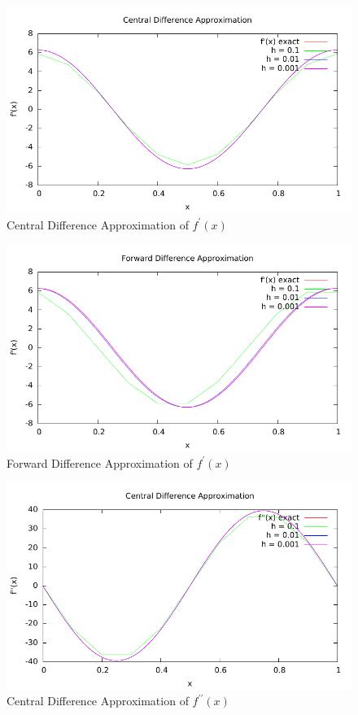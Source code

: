 \documentclass[addpoints]{exam}
\begin{document}
\begin{questions}
\begin{solution}
\begin{figure}[H]
\centering
\includegraphics{CD.pdf}
\caption{Central Difference Approximation of $f^{\prime}(x)$}
\end{figure}

\begin{figure}[H]
\centering
\includegraphics{FWD.pdf}
\caption{Forward Difference Approximation of $f^{\prime}(x)$}
\end{figure}

\begin{figure}[H]
\centering
\includegraphics{CD2.pdf}
\caption{Central Difference Approximation of $f^{\prime \prime}(x)$}
\end{figure}


\end{solution}
\end{questions}
\end{document}
